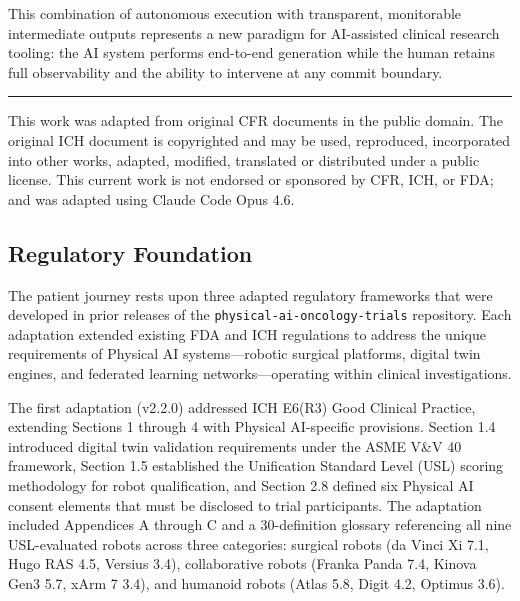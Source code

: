 \documentclass{article}
\begin{document}
\vspace{-0.1cm}

This combination of autonomous execution with transparent, monitorable intermediate outputs represents a new paradigm for AI-assisted clinical research tooling: the AI system performs end-to-end generation while the human retains full observability and the ability to intervene at any commit boundary.

\vspace{2.5cm}

\noindent\rule{\textwidth}{0.4pt}

{\footnotesize This work was adapted from original CFR documents in the public domain. The original ICH document is copyrighted and may be used, reproduced, incorporated into other works, adapted, modified, translated or distributed under a public license. This current work is not endorsed or sponsored by CFR, ICH, or FDA; and was adapted using Claude Code Opus 4.6.}

\newpage

\tableofcontents

\vspace{0.05cm}

\subsection{Regulatory Foundation}
\label{sec:regulatory-foundation}

The patient journey rests upon three adapted regulatory frameworks that were developed in prior releases of the \texttt{physical-ai-oncology-trials} repository. Each adaptation extended existing FDA and ICH regulations to address the unique requirements of Physical AI systems---robotic surgical platforms, digital twin engines, and federated learning networks---operating within clinical investigations.

The first adaptation (v2.2.0) addressed ICH E6(R3) Good Clinical Practice, extending Sections 1 through 4 with Physical AI-specific provisions. Section 1.4 introduced digital twin validation requirements under the ASME V\&V 40 framework, Section 1.5 established the Unification Standard Level (USL) scoring methodology for robot qualification, and Section 2.8 defined six Physical AI consent elements that must be disclosed to trial participants. The adaptation included Appendices A through C and a 30-definition glossary referencing all nine USL-evaluated robots across three categories: surgical robots (da Vinci Xi 7.1, Hugo RAS 4.5, Versius 3.4), collaborative robots (Franka Panda 7.4, Kinova Gen3 5.7, xArm 7 3.4), and humanoid robots (Atlas 5.8, Digit 4.2, Optimus 3.6).
\end{document}

